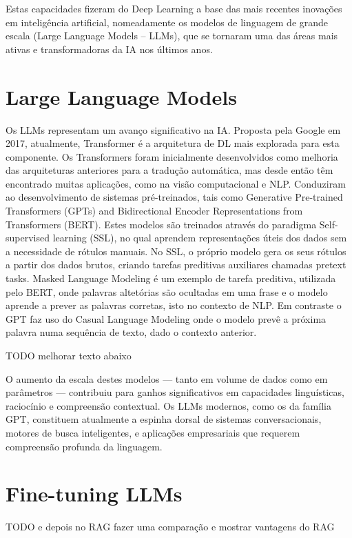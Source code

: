 Estas capacidades fizeram do Deep Learning a base das mais recentes inovações em inteligência artificial, nomeadamente os modelos de linguagem de grande escala 
(Large Language Models – LLMs), que se tornaram uma das áreas mais ativas e transformadoras da IA nos últimos anos.




\section{Large Language Models}

Os LLMs representam um avanço significativo na IA. Proposta pela Google em 2017, atualmente, Transformer é a arquitetura de DL mais explorada para esta componente. Os Transformers foram inicialmente desenvolvidos como melhoria das arquiteturas anteriores para a tradução automática, mas desde então têm encontrado muitas aplicações, como na visão computacional e NLP. Conduziram ao desenvolvimento de sistemas pré-treinados, tais como Generative Pre-trained Transformers (GPTs) and Bidirectional Encoder Representations from Transformers (BERT). Estes modelos são treinados através do paradigma Self-supervised learning (SSL), no qual aprendem representações úteis dos dados sem a necessidade de rótulos manuais. No SSL, o próprio modelo gera os seus rótulos a partir dos dados brutos, criando tarefas preditivas auxiliares chamadas pretext tasks. Masked Language Modeling é um exemplo de tarefa preditiva, utilizada pelo BERT, onde palavras altetórias são ocultadas em uma frase e o modelo aprende a prever as palavras corretas, isto no contexto de NLP. Em contraste o GPT faz uso do Casual Language Modeling onde o modelo prevê a próxima palavra numa sequência de texto, dado o contexto anterior.

TODO melhorar texto abaixo 

O aumento da escala destes modelos — tanto em volume de dados como em parâmetros — contribuiu para ganhos significativos em capacidades linguísticas, raciocínio e compreensão contextual. Os LLMs modernos, como os da família GPT, constituem atualmente a espinha dorsal de sistemas conversacionais, motores de busca inteligentes, e aplicações empresariais que requerem compreensão profunda da linguagem.

\section{Fine-tuning LLMs}

 TODO e depois no RAG fazer uma comparação e mostrar vantagens do RAG

